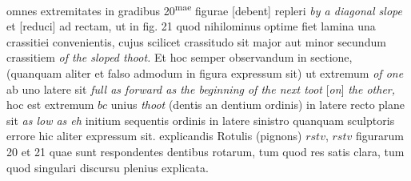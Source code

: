 omnes extremitates  in gradibus 20\textsuperscript{mae} figurae [debent] repleri \textit{by a diagonal slope} et [reduci] ad rectam, ut in fig. 21 quod nihilominus optime fiet lamina una crassitiei convenientis, cujus scilicet crassitudo sit major aut minor secundum crassitiem \textit{of the sloped thoot.} Et hoc semper observandum in sectione, (quanquam aliter et falso admodum in figura expressum sit) ut extremum \textit{of one}  ab uno latere sit \textit{full as forward as the beginning of the next toot} [\textit{on}] \textit{the other,} hoc est extremum $bc$ unius \textit{thoot} (dentis an dentium ordinis) in latere recto plane sit \textit{as low as eh} initium sequentis ordinis in latere sinistro quanquam sculptoris errore hic aliter expressum sit.  explicandis Rotulis (pignons) $rstv$, $rstv$ figurarum 20 et 21 quae sunt respondentes dentibus rotarum, tum quod res satis clara, tum quod singulari discursu plenius explicata. 